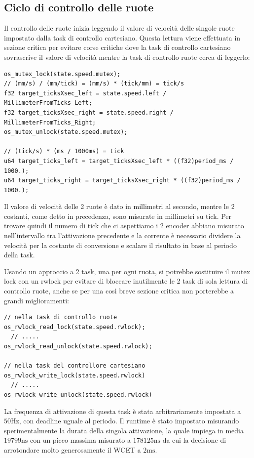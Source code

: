 \documentclass[11pt]{article}
\begin{document}
\subsection{Ciclo di controllo delle ruote}
\label{sec:org98722f5}
Il controllo delle ruote inizia leggendo il valore di velocità delle singole ruote impostato dalla task di controllo cartesiano. Questa lettura viene effettuata in sezione critica per evitare corse critiche dove la task di controllo cartesiano sovrascrive il valore di velocità mentre la task di controllo ruote cerca di leggerlo:
\begin{verbatim}
os_mutex_lock(state.speed.mutex);
// (mm/s) / (mm/tick) = (mm/s) * (tick/mm) = tick/s
f32 target_ticksXsec_left = state.speed.left / MillimeterFromTicks_Left;
f32 target_ticksXsec_right = state.speed.right / MillimeterFromTicks_Right;
os_mutex_unlock(state.speed.mutex);

// (tick/s) * (ms / 1000ms) = tick
u64 target_ticks_left = target_ticksXsec_left * ((f32)period_ms / 1000.);
u64 target_ticks_right = target_ticksXsec_right * ((f32)period_ms / 1000.);
\end{verbatim}
Il valore di velocità delle 2 ruote è dato in millimetri al secondo, mentre le 2 costanti, come detto in precedenza, sono misurate in millimetri su tick. Per trovare quindi il numero di tick che ci aspettiamo i 2 encoder abbiano misurato nell'intervallo tra l'attivazione precedente e la corrente è necessario dividere la velocità per la costante di conversione e scalare il risultato in base al periodo della task.

Usando un approccio a 2 task, una per ogni ruota, si potrebbe sostituire il mutex lock con un rwlock per evitare di bloccare inutilmente le 2 task di sola lettura di controllo ruote, anche se per una così breve sezione critica non porterebbe a grandi miglioramenti:
\begin{verbatim}
// nella task di controllo ruote
os_rwlock_read_lock(state.speed.rwlock);
  // .....
os_rwlock_read_unlock(state.speed.rwlock);

// nella task del controllore cartesiano
os_rwlock_write_lock(state.speed.rwlock)
  // .....
os_rwlock_write_unlock(state.speed.rwlock)
\end{verbatim}

La frequenza di attivazione di questa task è stata arbitrariamente impostata a \(50\text{Hz}\), con deadline uguale al periodo. Il runtime è stato impostato misurando sperimentalmente la durata della singola attivazione, la quale impiega in media \(19799\text{ns}\) con un picco massima misurato a \(178125\text{ns}\) da cui la decisione di arrotondare molto generosamente il WCET a \(2\text{ms}\).
\end{document}
